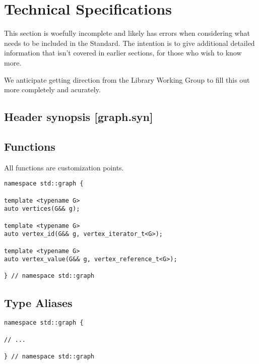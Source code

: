 \section{Technical Specifications}



This section is woefully incomplete and likely has errors when considering what needs to be included in the Standard. The intention is to give additional detailed information that isn't covered in earlier sections, for those who wish to know more.

We anticipate getting direction from the Library Working Group to fill this out more completely and acurately.

\subsection{Header  synopsis [graph.syn]}

\subsection{Functions}
All functions are customization points.

\begin{lstlisting}
namespace std::graph {

template <typename G>
auto vertices(G&& g);

template <typename G>
auto vertex_id(G&& g, vertex_iterator_t<G>);

template <typename G>
auto vertex_value(G&& g, vertex_reference_t<G>);

} // namespace std::graph
\end{lstlisting}

\subsection{Type Aliases}
\begin{lstlisting}
namespace std::graph {

// ...

} // namespace std::graph
\end{lstlisting}

